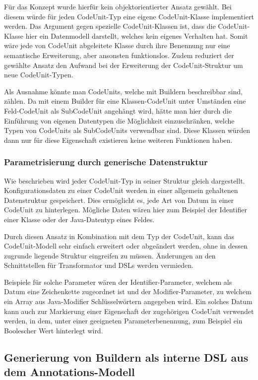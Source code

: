 \documentclass[12pt,oneside,a4paper,parskip]{scrbook}
\begin{document}
Für das Konzept wurde hierfür kein objektorientierter Ansatz gewählt. Bei diesem würde für jeden CodeUnit-Typ eine eigene CodeUnit-Klasse implementiert werden. Das Argument gegen spezielle CodeUnit-Klassen ist, dass die CodeUnit-Klasse hier ein Datenmodell darstellt, welches kein eigenes Verhalten hat. Somit wäre jede von CodeUnit abgeleitete Klasse durch ihre Benennung nur eine semantische Erweiterung, aber ansonsten funktionslos. Zudem reduziert der gewählte Ansatz den Aufwand bei der Erweiterung der CodeUnit-Struktur um neue CodeUnit-Typen.

Als Ausnahme könnte man CodeUnits, welche mit Buildern beschreibbar sind, zählen. Da mit einem Builder für eine Klassen-CodeUnit unter Umständen eine Feld-CodeUnit als SubCodeUnit angehängt wird, hätte man hier durch die Einführung von eigenen Datentypen die Möglichkeit einzuschränken, welche Typen von CodeUnits als SubCodeUnits verwendbar sind. Diese Klassen würden dann nur für diese Eigenschaft existieren keine weiteren Funktionen haben.

\subsubsection{Parametrisierung durch generische Datenstruktur}

Wie beschrieben wird jeder CodeUnit-Typ in seiner Struktur gleich dargestellt. Konfigurationsdaten zu einer CodeUnit werden in einer allgemein gehaltenen Datenstruktur gespeichert. Dies ermöglicht es, jede Art von Datum in einer CodeUnit zu hinterlegen. Mögliche Daten wären hier zum Beispiel der Identifier einer Klasse oder der Java-Datentyp eines Feldes.

Durch diesen Ansatz in Kombination mit dem Typ der CodeUnit, kann das CodeUnit-Modell sehr einfach erweitert oder abgeändert werden, ohne in dessen zugrunde liegende Struktur eingreifen zu müssen. Änderungen an den Schnittstellen für Transformator und DSLs werden vermieden.

Beispiele für solche Parameter wären der Identifier-Parameter, welchem als Datum eine Zeichenkette zugeordnet ist und der Modifier-Parameter, zu welchem ein Array aus Java-Modifier Schlüsselwörtern angegeben wird. Ein solches Datum kann auch zur Markierung einer Eigenschaft der zugehörigen CodeUnit verwendet werden, in dem, unter einer geeigneten Parameterbenennung, zum Beispiel ein Boolescher Wert hinterlegt wird.

\subsection{Generierung von Buildern als interne DSL aus dem Annotations-Modell}
\end{document}
